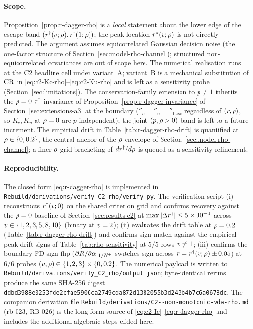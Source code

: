 \paragraph{Scope.}
Proposition~\ref{prop:r-dagger-rho} is a \emph{local}
statement about the lower edge of the escape band $(r^{\dagger}(v;\rho),
r^{\dagger}(1;\rho))$; the peak location $r^\star(v;\rho)$ is
not directly predicted. The argument assumes equicorrelated
Gaussian decision noise (the one-factor structure of
Section~\ref{sec:model-rho-channel}); structured non-equicorrelated
covariances are out of scope here. The numerical realisation runs
at the C2 headline cell under variant~A; variant~B is a mechanical
substitution of $\mathrm{CR}$ in \eqref{eq:c2-Kc-rho}--\eqref{eq:c2-Ku-rho}
and is left as a sensitivity probe
(Section~\ref{sec:limitations}). The conservation-family extension
to $p \ne 1$ inherits the $\rho = 0$ $r^{\dagger}$-invariance of
Proposition~\ref{prop:r-dagger-invariance} of
Section~\ref{sec:extensions-a3} at the boundary
($\dprime_c = \dprime_u = \dprime_{\mathrm{base}}$ regardless of
$(r, p)$, so $K_c, K_u$ at $\rho = 0$ are $p$-independent);
the joint $(p, \rho > 0)$ band is left to a future increment.
The empirical drift in Table~\ref{tab:r-dagger-rho-drift} is
quantified at $\rho \in \{0, 0.2\}$, the central anchor of the
$\rho$ envelope of Section~\ref{sec:model-rho-channel}; a finer
$\rho$-grid bracketing of $dr^{\dagger}/d\rho$ is queued as a
sensitivity refinement.

\paragraph{Reproducibility.}
The closed form \eqref{eq:r-dagger-rho} is implemented in
\texttt{Rebuild/derivations/verify\_C2\_rho/verify.py}. The
verification script (i) reconstructs $r^{\dagger}(v;0)$ on the
shared criterion grid and confirms recovery against the
$\rho = 0$ baseline of
Section~\ref{sec:results-c2} at
$\max|\Delta r^{\dagger}| \le 5 \times 10^{-4}$ across
$v \in \{1, 2, 3, 5, 8, 10\}$ (binary at $v = 2$);
(ii) evaluates the drift table at $\rho = 0.2$
(Table~\ref{tab:r-dagger-rho-drift}) and confirms
sign-match against the empirical peak-drift signs of
Table~\ref{tab:rho-sensitivity} at $5/5$ rows
$v \ne 1$; (iii) confirms the boundary-FD sign-flip
($\partial R/\partial\alpha|_{1/N^{+}}$ switches sign across
$r = r^{\dagger}(v;\rho) \pm 0.05$) at $6/6$ probes
$(v, \rho) \in \{1, 2, 3\} \times \{0, 0.2\}$. The numerical
payload is written to
\texttt{Rebuild/derivations/verify\_C2\_rho/output.json}; byte-identical
reruns produce the same SHA-256 digest
\texttt{ddbd3988e0253fde2cfae5906ca2749cda872d1382055b3d243b4b7c6a0678dc}.
The companion derivation file
\texttt{Rebuild/derivations/C2-{}-non-monotonic-vda-rho.md} (rb-023,
RB-026) is the long-form source of
\eqref{eq:c2-Ic}--\eqref{eq:r-dagger-rho} and includes the
additional algebraic steps elided here.

